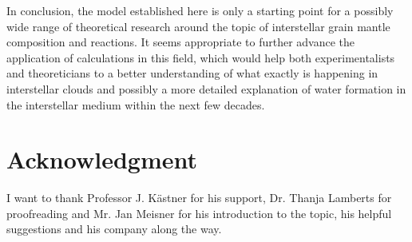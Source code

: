 \documentclass[8.5pt,twoside,twocolumn]{article}
\theoremstyle{standard}
\begin{document}
In conclusion, the model established here is only a starting point for a
possibly wide range of theoretical research around the topic of interstellar
grain mantle composition and reactions. It seems appropriate to further advance
the application of  calculations in this field, which would help
both experimentalists and theoreticians to a better understanding of what
exactly is happening in interstellar clouds and possibly a more detailed
explanation of water formation in the interstellar medium within the next few
decades.

\section*{Acknowledgment}
I want to thank Professor J. Kästner for his support, Dr. Thanja Lamberts
for proofreading and Mr. Jan Meisner for his introduction to the topic, his
helpful suggestions and his company along the way.

% 

%
%

%
{}
\end{document}
